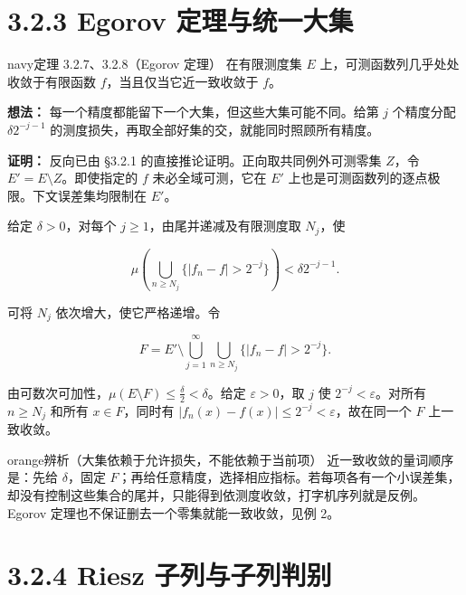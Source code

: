 \documentclass[11pt,a4paper]{article}
\begin{document}
\section[\S{}3.2.3 Egorov
定理与统一大集]{3.2.3 Egorov
定理与统一大集}\label{egorov-ux5b9aux7406ux4e0eux7edfux4e00ux5927ux96c6}

\begin{sboxenv}{navy}{定理 3.2.7、3.2.8（Egorov 定理）}
在有限测度集 \(E\) 上，可测函数列几乎处处收敛于有限函数
\(f\)，当且仅当它近一致收敛于 \(f\)。

\end{sboxenv}

\textbf{想法：} 每一个精度都能留下一个大集，但这些大集可能不同。给第
\(j\) 个精度分配 \(\delta2^{-j-1}\)
的测度损失，再取全部好集的交，就能同时照顾所有精度。

\textbf{证明：} 反向已由 §3.2.1 的直接推论证明。正向取共同例外可测零集
\(Z\)，令 \(E'=E\setminus Z\)。即使指定的 \(f\) 未必全域可测，它在
\(E'\) 上也是可测函数列的逐点极限。下文误差集均限制在 \(E'\)。

给定 \(\delta>0\)，对每个 \(j\ge1\)，由尾并递减及有限测度取 \(N_j\)，使

\begin{equation*}
\mu\!\left(\bigcup_{n\ge N_j}\{|f_n-f|>2^{-j}\}\right)
<\delta2^{-j-1}.
\end{equation*}

可将 \(N_j\) 依次增大，使它严格递增。令

\begin{equation*}
F=E'\setminus\bigcup_{j=1}^{\infty}\bigcup_{n\ge N_j}\{|f_n-f|>2^{-j}\}.
\tag{3.2.3}
\end{equation*}

由可数次可加性，\(\mu(E\setminus F)\le\frac\delta2<\delta\)。给定
\(\varepsilon>0\)，取 \(j\) 使 \(2^{-j}<\varepsilon\)。对所有
\(n\ge N_j\) 和所有 \(x\in F\)，同时有
\(|f_n(x)-f(x)|\le2^{-j}<\varepsilon\)，故在同一个 \(F\) 上一致收敛。

\begin{sboxenv}{orange}{辨析（大集依赖于允许损失，不能依赖于当前项）}
近一致收敛的量词顺序是：先给 \(\delta\)，固定
\(F\)；再给任意精度，选择相应指标。若每项各有一个小误差集，却没有控制这些集合的尾并，只能得到依测度收敛，打字机序列就是反例。Egorov
定理也不保证删去一个零集就能一致收敛，见例 2。

\end{sboxenv}

\section[\S{}3.2.4 Riesz
子列与子列判别]{3.2.4 Riesz
子列与子列判别}\label{riesz-ux5b50ux5217ux4e0eux5b50ux5217ux5224ux522b}
\end{document}
